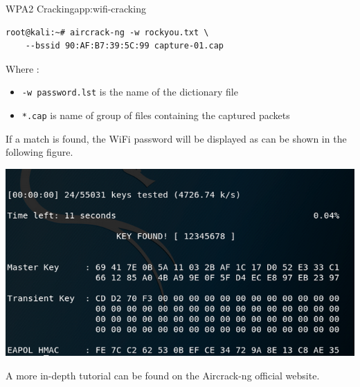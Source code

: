 \begin{appchaptercover}{WPA2 Cracking}{app:wifi-cracking}
\begin{center}
\begin{minipage}{.75\linewidth}
\begin{lstlisting}
root@kali:~# aircrack-ng -w rockyou.txt \
	--bssid 90:AF:B7:39:5C:99 capture-01.cap
\end{lstlisting}
\end{minipage}
\end{center}

Where :
\begin{itemize}
  \item \texttt{-w password.lst} is the name of the dictionary file
  \item \texttt{*.cap} is name of group of files containing the captured packets
\end{itemize}

If a match is found, the WiFi password will be displayed as can be shown in the following figure.

\begin{center}
\includegraphics[width=.8\linewidth]{figures/wpa2-cracking-aircrack-ng}
\end{center}

A more in-depth tutorial can be found on the Aircrack-ng official website. \cite{aircrack-ng-wpa-cracking}

\end{appchaptercover}
